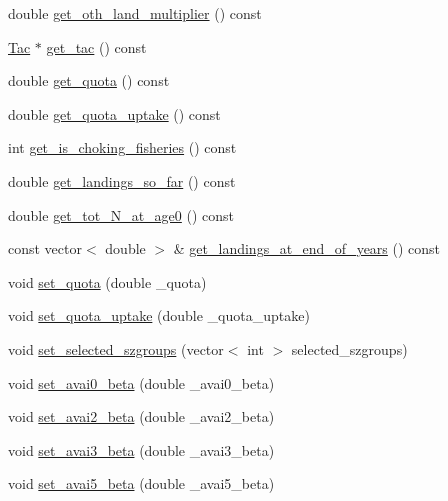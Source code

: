 \begin{DoxyCompactItemize}
double \mbox{\hyperlink{class_population_a80d0207764d0664c56d6a254b37fac68}{get\+\_\+oth\+\_\+land\+\_\+multiplier}} () const
\item 
\mbox{\hyperlink{class_tac}{Tac}} $\ast$ \mbox{\hyperlink{class_population_a3d71e85f11c809a36f98b21f0ecc5fda}{get\+\_\+tac}} () const
\item 
double \mbox{\hyperlink{class_population_a796affd235f53baa7a3aa6093726a6dc}{get\+\_\+quota}} () const
\item 
double \mbox{\hyperlink{class_population_a22fee0ab6062785e1ac22cdfd435c99e}{get\+\_\+quota\+\_\+uptake}} () const
\item 
int \mbox{\hyperlink{class_population_a1272bf327ac3730b3a381fb4fa4a3bf0}{get\+\_\+is\+\_\+choking\+\_\+fisheries}} () const
\item 
double \mbox{\hyperlink{class_population_afa14273ce155674e6842390336d45056}{get\+\_\+landings\+\_\+so\+\_\+far}} () const
\item 
double \mbox{\hyperlink{class_population_a063d604c1f6a28fe3c4b12732f6f1fe8}{get\+\_\+tot\+\_\+\+N\+\_\+at\+\_\+age0}} () const
\item 
const vector$<$ double $>$ \& \mbox{\hyperlink{class_population_ae4e58ced64ec6b922e84a746c8366b0c}{get\+\_\+landings\+\_\+at\+\_\+end\+\_\+of\+\_\+years}} () const
\item 
void \mbox{\hyperlink{class_population_a30c90339519ca9978759e9aff63ea74d}{set\+\_\+quota}} (double \+\_\+quota)
\item 
void \mbox{\hyperlink{class_population_a794ee0f30fa3216c39ccd47e5db05574}{set\+\_\+quota\+\_\+uptake}} (double \+\_\+quota\+\_\+uptake)
\item 
void \mbox{\hyperlink{class_population_a3b30c29f483a2fc6c5f024a497fb6f93}{set\+\_\+selected\+\_\+szgroups}} (vector$<$ int $>$ selected\+\_\+szgroups)
\item 
void \mbox{\hyperlink{class_population_af7162106eadd591efe14813b8cd8000d}{set\+\_\+avai0\+\_\+beta}} (double \+\_\+avai0\+\_\+beta)
\item 
void \mbox{\hyperlink{class_population_a254b6196bc625b6a1046bbb82fb4d9f3}{set\+\_\+avai2\+\_\+beta}} (double \+\_\+avai2\+\_\+beta)
\item 
void \mbox{\hyperlink{class_population_a99efd92bcfa1d272e21e7fe89fb66d8d}{set\+\_\+avai3\+\_\+beta}} (double \+\_\+avai3\+\_\+beta)
\item 
void \mbox{\hyperlink{class_population_a59678099e8db0d210b1ec2ab97ac1028}{set\+\_\+avai5\+\_\+beta}} (double \+\_\+avai5\+\_\+beta)
\item 

\end{DoxyCompactItemize}
